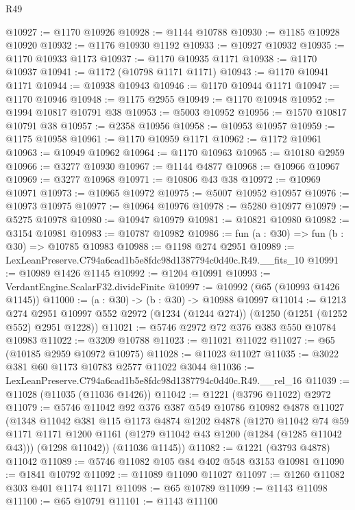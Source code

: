\begin{lexlean}{R49}
\begin{coremodule}
@10927 := @1170 @10926
@10928 := @1144 @10788
@10930 := @1185 @10928 @10920
@10932 := @1176 @10930 @1192
@10933 := @10927 @10932
@10935 := @1170 @10933 @1173
@10937 := @1170 @10935 @1171
@10938 := @1170 @10937
@10941 := @1172 (@10798 @1171 @1171)
@10943 := @1170 @10941 @1171
@10944 := @10938 @10943
@10946 := @1170 @10944 @1171
@10947 := @1170 @10946
@10948 := @1175 @2955
@10949 := @1170 @10948
@10952 := @1994 @10817 @10791 @38
@10953 := @5003 @10952
@10956 := @1570 @10817 @10791 @38
@10957 := @2358 @10956
@10958 := @10953 @10957
@10959 := @1175 @10958
@10961 := @1170 @10959 @1171
@10962 := @1172 @10961
@10963 := @10949 @10962
@10964 := @1170 @10963
@10965 := @10180 @2959
@10966 := @3277 @10930
@10967 := @1144 @4877
@10968 := @10966 @10967
@10969 := @3277 @10968
@10971 := @10806 @43 @38
@10972 := @10969 @10971
@10973 := @10965 @10972
@10975 := @5007 @10952 @10957
@10976 := @10973 @10975
@10977 := @10964 @10976
@10978 := @5280 @10977
@10979 := @5275 @10978
@10980 := @10947 @10979
@10981 := @10821 @10980
@10982 := @3154 @10981
@10983 := @10787 @10982
@10986 := fun (a : @30) => fun (b : @30) => @10785 @10983
@10988 := @1198 @274 @2951
@10989 := LexLeanPreserve.C794a6cad1b5e8fdc98d1387794c0d40c.R49.__fits_10
@10991 := @10989 @1426 @1145
@10992 := @1204 @10991
@10993 := VerdantEngine.ScalarF32.divideFinite
@10997 := @10992 (@65 (@10993 @1426 @1145))
@11000 := (a : @30) -> (b : @30) -> @10988 @10997
@11014 := @1213
    @274
    @2951
    @10997
    @552
    @2972
    (@1234 (@1244 @274))
    (@1250 (@1251 (@1252 @552) @2951 @1228))
@11021 := @5746 @2972 @72 @376 @383 @550 @10784 @10983
@11022 := @3209 @10788
@11023 := @11021 @11022
@11027 := @65 (@10185 @2959 @10972 @10975)
@11028 := @11023 @11027
@11035 := @3022 @381 @60 @1173 @10783 @2577 @11022 @3044
@11036 := LexLeanPreserve.C794a6cad1b5e8fdc98d1387794c0d40c.R49.__rel_16
@11039 := @11028 (@11035 (@11036 @1426))
@11042 := @1221 (@3796 @11022) @2972
@11079 := @5746
    @11042
    @92
    @376
    @387
    @549
    @10786
    @10982
    @4878
    @11027
    (@1348
      @11042
      @381
      @115
      @1173
      @4874
      @1202
      @4878
      (@1270
        @11042
        @74
        @59
        @1171
        @1171
        @1200
        @1161
        (@1279 @11042 @43 @1200 (@1284 (@1285 @11042 @43)))
        (@1298 @11042))
      (@11036 @1145))
@11082 := @1221 (@3793 @4878) @11042
@11089 := @5746 @11082 @105 @84 @402 @548 @3153 @10981
@11090 := @1841 @10792
@11092 := @11089 @11090 @11027
@11097 := @1260 @11082 @303 @401 @1174 @1171
@11098 := @65 @10789
@11099 := @1143 @11098
@11100 := @65 @10791
@11101 := @1143 @11100

\end{coremodule}
\end{lexlean}
